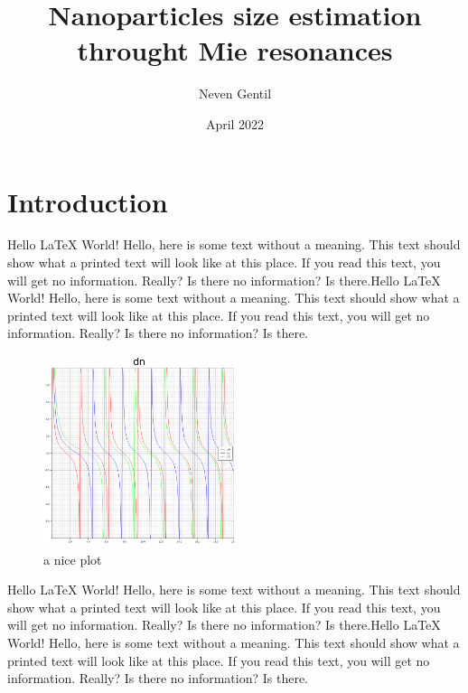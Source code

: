 \documentclass[12pt]{article}
\title{Nanoparticles size estimation throught Mie resonances}
\author{Neven Gentil}
\date{April 2022}
\begin{document}
\maketitle

\twocolumn

\section{Introduction}
Hello LaTeX World!
Hello, here is some text without a meaning. This text should show what a printed text will look like at this place.
If you read this text, you will get no information. Really? Is there no information? Is there.Hello LaTeX World!
Hello, here is some text without a meaning. This text should show what a printed text will look like at this place.
If you read this text, you will get no information. Really? Is there no information? Is there.
\begin{figure}[h]
    \centering
    \includegraphics[width=0.5\textwidth, height=0.25\textheight]{dn.png}
    \caption{a nice plot}
    \label{fig:dn_plot}
\end{figure}
Hello LaTeX World!
Hello, here is some text without a meaning. This text should show what a printed text will look like at this place.
If you read this text, you will get no information. Really? Is there no information? Is there.Hello LaTeX World!
Hello, here is some text without a meaning. This text should show what a printed text will look like at this place.
If you read this text, you will get no information. Really? Is there no information? Is there.
\end{document}
